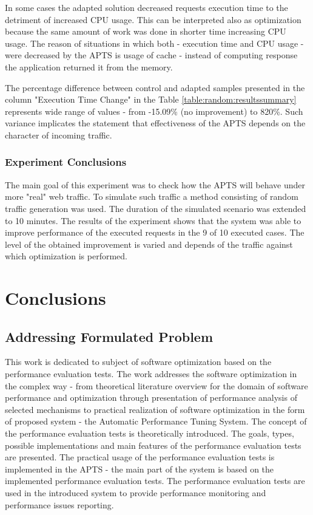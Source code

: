 \documentclass[12pt,a4paper]{article}
\begin{document}
In some cases the adapted solution decreased requests execution time to the detriment of increased CPU usage. This can be interpreted also as optimization because the same amount of work was done in shorter time increasing CPU usage. The reason of situations in which both - execution time and CPU usage - were decreased by the APTS is usage of cache - instead of computing response the application returned it from the memory. 

The percentage difference between control and adapted samples presented in the column "Execution Time Change" in the Table \ref{table:random:resultssummary} represents wide range of values - from -15.09\% (no improvement) to 820\%. Such variance implicates the statement that effectiveness of the APTS depends on the character of incoming traffic.  


\subsubsection{Experiment Conclusions}

The main goal of this experiment was to check how the APTS will behave under more "real" web traffic. To simulate such traffic a method consisting of random traffic generation was used. The duration of the simulated scenario was extended to 10 minutes. The results of the experiment shows that the system was able to improve performance of the executed requests in the 9 of 10 executed cases. The level of the obtained improvement is varied and depends of the traffic against which optimization is performed.


\section{Conclusions} \label{section:conclusions}

\subsection{Addressing Formulated Problem}

This work is dedicated to subject of software optimization based on the performance evaluation tests. The work addresses the software optimization in the complex way - from theoretical literature overview for the domain of software performance and optimization through presentation of performance analysis of selected mechanisms to practical realization of software optimization in the form of proposed system - the Automatic Performance Tuning System. The concept of the performance evaluation tests is theoretically introduced. The goals, types, possible implementations and main features of the performance evaluation tests are presented. The practical usage of the performance evaluation tests is implemented in the APTS - the main part of the system is based on the implemented performance evaluation tests. The performance evaluation tests are used in the introduced system to provide performance monitoring and performance issues reporting.
\end{document}
